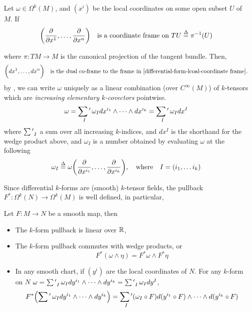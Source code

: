 \documentclass[../main-manifolds.tex]{subfiles}
\begin{document}
    \begin{definition}
        Let $\omega\in\Omega^k(M)$, and $(x^i)$ be the local coordinates on some open subset $U$ of $M$. If 
        \begin{equation}\label{differential-form-lcoal-coordinate frame}
            \biggl(\pdv{x^1},\ldots,\pdv{x^n}\biggr)\quad\text{is a coordinate frame on }TU \overset{\Delta}{=} \pi^{-1}(U)
        \end{equation}
            
        where $\pi: TM\to M$ is the canonical projection of the tangent bundle. Then,
        \[
            \biggl(dx^1,\ldots, dx^n\biggr)\quad\text{is the dual co-frame to the frame in  \Cref{differential-form-lcoal-coordinate frame}.}
        \]
        by , we can write $\omega$ uniquely as a linear combination (over $C^\infty(M)$) of $k$-tensors which are \emph{increasing elementary $k$-covectors} pointwise.
        \[
            \omega = \mathop{\sum\nolimits{'}}_I \omega_I dx^{i_1}\wedge\cdots\wedge dx^{i_k} = \mathop{\sum\nolimits{'}}_I \omega_Idx^{I}
        \]
        where $\mathop{\sum\nolimits{'}}_I$ a sum over all increasing $k$-indices, and $dx^{I}$ is the shorthand for the wedge product above, and $\omega_I$ is a number obtained by evaluating $\omega$ at the following
        \[
            \omega_I \defined \omega\qty(\pdv{x^{i_1}},\ldots, \pdv{x^{i_k}}),\qqtext{where} I = (i_1,\ldots i_k)
        \]
    \end{definition}
    Since differential $k$-forms are (smooth) $k$-tensor fields, the pullback $F^*: \Omega^k(N)\to \Omega^k(M)$ is well defined, in particular,
    \begin{wts}
           Let $F:M\to N$ be a smooth map, then
           \begin{itemize}
               \item The $k$-form pullback is linear over $\mathbb{R}$, 
               \item The $k$-form pullback commutes with wedge products, or 
               \[
                F^*(\omega\wedge\eta) = F^*\omega\wedge F^*\eta
               \]
               \item In any smooth chart, if $(y^i)$ are the local coordinates of $N$. For any $k$-form on $N$ $\omega = \mathop{\sum\nolimits{'}}_I \omega_Idy^{i_1}\wedge\cdots\wedge dy^{i_k} = \mathop{\sum\nolimits{'}}_I \omega_Idy^I$,
               \[
                    F^*\qty(\mathop{\sum\nolimits{'}} \omega_I dy^{i_1}\wedge\cdots\wedge dy^{i_k}) = \mathop{\sum\nolimits{'}}_I(\omega_I\circ F)d(y^{i_1}\circ F)\wedge\cdots\wedge d(y^{i_k}\circ F)
               \]
           \end{itemize}
    \end{wts}
\end{document}
